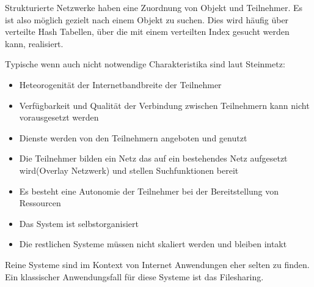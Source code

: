 Strukturierte \pTp Netzwerke haben eine Zuordnung von Objekt und Teilnehmer. Es ist also möglich gezielt nach einem Objekt zu suchen. Dies wird häufig über verteilte Hash Tabellen, über die mit einem verteilten Index gesucht werden kann, realisiert.


Typische wenn auch nicht notwendige Charakteristika sind laut Steinmetz\cite{p2pBook2005}:

\begin{itemize}
  \item Heteorogenität der Internetbandbreite der Teilnehmer
  \item Verfügbarkeit und Qualität der Verbindung zwischen Teilnehmern kann nicht vorausgesetzt werden
  \item Dienste werden von den Teilnehmern angeboten und genutzt
  \item Die Teilnehmer bilden ein Netz das auf ein bestehendes Netz aufgesetzt wird(Overlay Netzwerk) und stellen Suchfunktionen bereit
  \item Es besteht eine Autonomie der Teilnehmer bei der Bereitstellung von Ressourcen
  \item Das System ist selbstorganisiert
  \item Die restlichen Systeme müssen nicht skaliert werden und bleiben intakt
\end{itemize}

Reine \pTp \cdn Systeme sind im Kontext von Internet Anwendungen eher selten zu finden. Ein klassischer Anwendungsfall für diese Systeme ist das Filesharing.


%
%

